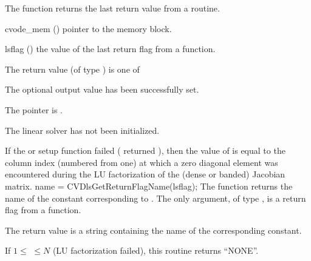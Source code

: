 {
  The function  returns the
  last return value from a {\cvdls} routine.
}
{
  \begin{args}
  \item[cvode\_mem] ()
    pointer to the {\cvode} memory block.
  \item[lsflag] ()
    the value of the last return flag from a {\cvdls} function.
  \end{args}
}
{
  The return value  (of type ) is one of
  \begin{args}
  \item[\Id{CVDLS\_SUCCESS}]
    The optional output value has been successfully set.
  \item[\Id{CVDLS\_MEM\_NULL}]
    The  pointer is .
  \item[\Id{CVDLS\_LMEM\_NULL}]
    The {\cvdls} linear solver has not been initialized.
  \end{args}
}
{
  If the {\sunlinsoldense} or {\sunlinsolband} setup function failed
  ( returned ), then the value of
   is equal to the column index (numbered from one) at
  which a zero diagonal element was encountered during the LU
  factorization of the (dense or banded) Jacobian matrix.
}
{
  name = CVDlsGetReturnFlagName(lsflag);
}
{
  The function  returns the
  name of the {\cvdls} constant corresponding to .
}
{
  The only argument, of type , is a return flag from a {\cvdls}
  function.
}
{
  The return value is a string containing the name of the corresponding constant.

  If $1 \leq $  $ \leq N$ (LU factorization failed), this routine
  returns ``NONE''.
}
{}


